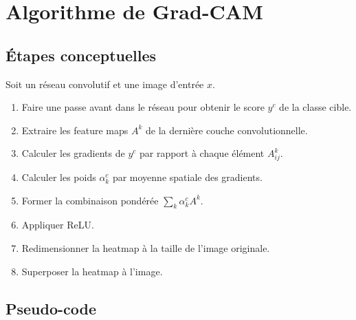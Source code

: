 ﻿\documentclass[11pt,a4paper]{article}
\begin{document}
\section{Algorithme de Grad-CAM}

\subsection{Étapes conceptuelles}

Soit un réseau convolutif et une image d'entrée $x$.

\begin{enumerate}[label=\arabic*)]
    \item Faire une passe avant dans le réseau pour obtenir le score $y^c$ de la classe cible.
    \item Extraire les feature maps $A^k$ de la dernière couche convolutionnelle.
    \item Calculer les gradients de $y^c$ par rapport à chaque élément $A_{ij}^k$.
    \item Calculer les poids $\alpha_k^c$ par moyenne spatiale des gradients.
    \item Former la combinaison pondérée $\sum_k \alpha_k^c A^k$.
    \item Appliquer ReLU.
    \item Redimensionner la heatmap à la taille de l'image originale.
    \item Superposer la heatmap à l'image.
\end{enumerate}

\subsection{Pseudo-code}
\end{document}
